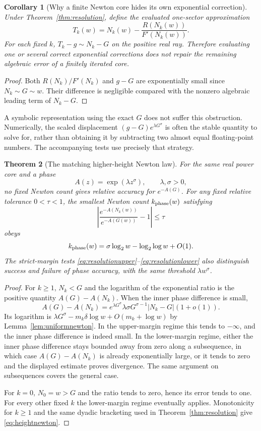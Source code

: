 \documentclass[11pt,a4paper]{article}
\newtheorem{theorem}{Theorem}[section]
\newtheorem{corollary}[theorem]{Corollary}
\theoremstyle{definition}
\theoremstyle{remark}
\numberwithin{equation}{section}
\begin{document}
\begin{corollary}[Why a finite Newton core hides its own exponential correction]\label{cor:hidden}
Under Theorem~\ref{thm:resolution}, define the evaluated one-sector approximation
\[
 T_k(w)=N_k(w)-\frac{R(N_k(w))}{F'(N_k(w))}.
\]
For each fixed $k$, $T_k-g\sim N_k-G$ on the positive real ray. Therefore evaluating one or several correct exponential corrections does not repair the remaining algebraic error of a finitely iterated core.
\end{corollary}
\begin{proof}
Both $R(N_k)/F'(N_k)$ and $g-G$ are exponentially small since $N_k\sim G\sim w$. Their difference is negligible compared with the nonzero algebraic leading term of $N_k-G$.
\end{proof}

A symbolic representation using the exact $G$ does not suffer this obstruction. Numerically, the scaled displacement $(g-G)e^{\lambda G^\sigma}$ is often the stable quantity to solve for, rather than obtaining it by subtracting two almost equal floating-point numbers. The accompanying tests use precisely that strategy.

\begin{theorem}[The matching higher-height Newton law]\label{thm:heightnewton}
For the same real power core and a phase
\[
 A(z)=\exp(\lambda z^\sigma),\qquad \lambda,\sigma>0,
\]
no fixed Newton count gives relative accuracy for $e^{-A(G)}$. For any fixed relative tolerance $0<\tau<1$, the smallest Newton count $k_{\rm phase}(w)$ satisfying
\[
 \left|\frac{e^{-A(N_k(w))}}{e^{-A(G(w))}}-1\right|\le\tau
\]
obeys
\begin{equation}\label{eq:heightnewton}
 k_{\rm phase}(w)=\sigma\log_2w-\log_2\log w+O(1).
\end{equation}
The strict-margin tests \eqref{eq:resolutionupper}--\eqref{eq:resolutionlower} also distinguish success and failure of phase accuracy, with the same threshold $\lambda w^\sigma$.
\end{theorem}
\begin{proof}
For $k\ge1$, $N_k<G$ and the logarithm of the exponential ratio is the positive quantity $A(G)-A(N_k)$. When the inner phase difference is small,
\[
 A(G)-A(N_k)
 =e^{\lambda G^\sigma}\lambda\sigma G^{\sigma-1}|N_k-G|(1+o(1)).
\]
Its logarithm is $\lambda G^\sigma-m_k\delta\log w+O(m_k+\log w)$ by Lemma~\ref{lem:uniformnewton}. In the upper-margin regime this tends to $-\infty$, and the inner phase difference is indeed small. In the lower-margin regime, either the inner phase difference stays bounded away from zero along a subsequence, in which case $A(G)-A(N_k)$ is already exponentially large, or it tends to zero and the displayed estimate proves divergence. The same argument on subsequences covers the general case.

For $k=0$, $N_0=w>G$ and the ratio tends to zero, hence its error tends to one. For every other fixed $k$ the lower-margin regime eventually applies. Monotonicity for $k\ge1$ and the same dyadic bracketing used in Theorem~\ref{thm:resolution} give \eqref{eq:heightnewton}.
\end{proof}
\end{document}
